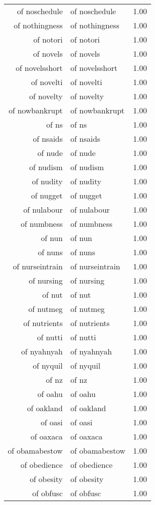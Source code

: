 \begin{table}[ht]
\begin{tabular}{rlr}
  of noschedule & of noschedule & 1.00 \\ 
  of nothingness & of nothingness & 1.00 \\ 
  of notori & of notori & 1.00 \\ 
  of novels & of novels & 1.00 \\ 
  of novelsshort & of novelsshort & 1.00 \\ 
  of novelti & of novelti & 1.00 \\ 
  of novelty & of novelty & 1.00 \\ 
  of nowbankrupt & of nowbankrupt & 1.00 \\ 
  of ns & of ns & 1.00 \\ 
  of nsaids & of nsaids & 1.00 \\ 
  of nude & of nude & 1.00 \\ 
  of nudism & of nudism & 1.00 \\ 
  of nudity & of nudity & 1.00 \\ 
  of nugget & of nugget & 1.00 \\ 
  of nulabour & of nulabour & 1.00 \\ 
  of numbness & of numbness & 1.00 \\ 
  of nun & of nun & 1.00 \\ 
  of nuns & of nuns & 1.00 \\ 
  of nurseintrain & of nurseintrain & 1.00 \\ 
  of nursing & of nursing & 1.00 \\ 
  of nut & of nut & 1.00 \\ 
  of nutmeg & of nutmeg & 1.00 \\ 
  of nutrients & of nutrients & 1.00 \\ 
  of nutti & of nutti & 1.00 \\ 
  of nyahnyah & of nyahnyah & 1.00 \\ 
  of nyquil & of nyquil & 1.00 \\ 
  of nz & of nz & 1.00 \\ 
  of oahu & of oahu & 1.00 \\ 
  of oakland & of oakland & 1.00 \\ 
  of oasi & of oasi & 1.00 \\ 
  of oaxaca & of oaxaca & 1.00 \\ 
  of obamabestow & of obamabestow & 1.00 \\ 
  of obedience & of obedience & 1.00 \\ 
  of obesity & of obesity & 1.00 \\ 
  of obfusc & of obfusc & 1.00 \\ 

\end{tabular}
\end{table}
